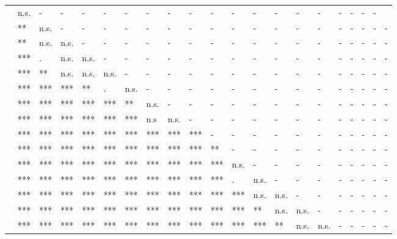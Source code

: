 \documentclass[11pt,fleqn]{article}
\newcommand{\6}{\mbox{$[\hspace*{-.6mm}[$}}
\newcommand{\9}{\mbox{$]\hspace*{-.6mm}]$}}
\begin{document}
\begin{table}[H]
\begin{tabular}{l l l l l l l l l l l l l l l l l l l l l }
\color{brown}{\em pretend}\color{black}	&  n.s. & - & - & - & - & - & - & - & - & - & - & - & - & - & - & - & - & - & - \\
\color{airforceblue}{\em be right}\color{black}	& ** & n.s. & - & - & - & - & - & - & - & - & - & - & - & - & - & - & - & - & - & - \\
\color{brown}{\em think}\color{black}		& ** & n.s. & n.s. & - & - & - & - & - & - & - & - & - & - & - & - & - & - & - & - & - \\
\color{brown}{\em suggest}\color{black}	& ***	& . & n.s. & n.s. & - & - & - & - & - & - & - & - & - & - & - & - & - & - & - & - \\
\color{brown}{\em say}	\color{black}	& ***	& ** & n.s. & n.s. & n.s. & - & - & - & - & - & - & - & - & - & - & - & - & - & - & - \\
\color{black}{\em prove}\color{black}		& ***	& *** &  ***  & ** & . & n.s. & - & - & - & - & - & - & - & - & - & - & - & - & - & - \\
\color{black}{\em confirm}\color{black}	&***	& ***  &  ***  &  ***  &  ***  & ** & n.s. & - & - & - & - & - & - & - & - & - & - & - & - & - \\
\color{black}{\em establish}\color{black}	&***	&  ***  &  ***  &  ***  &  ***  &  ***  & n.s & n.s. & - & - & - & - & - & - & - & - & - & - & - & - \\
\color{airforceblue}{\em demonstrate}\color{black} &*** & *** & *** & *** &  *** &  *** &  ***  &  ***  &  ***  & - & - & - & - & - & - & - & - & - & - & - \\
\color{black}{\em announce}\color{black}		& ***	& *** & *** & *** & *** & *** & *** &  ***  &  ***  & ** & - & - & - & - & - & - & - & - & - & - \\
\color{black}{\em confess}\color{black}	& ***	& *** & *** & *** & *** & *** & *** & *** & *** &  ***  & n.s. & - & - & - & - & - & - & - & - & - \\
\color{black}{\em admit}\color{black}		& ***	& *** & *** & *** & *** & *** & *** & *** & *** &  ***  & . & n.s. &  - & - & - & - & - & - & - & - \\
\color{blue}{\em reveal}\color{black}			& ***	& *** & *** & *** & *** & *** & *** & *** & *** &  ***  &  ***  & n.s. & n.s. & - & - & - & - & - & - & - \\
\color{black}{\em acknowledge}\color{black}	& ***	& *** & *** & *** & *** & *** & *** & *** & *** &  ***  &  ***  & ** & n.s. & n.s. & - & - & - & - & - & - \\
\color{black}{\em hear}\color{black}		& ***	& *** & *** & *** & *** & *** & *** & *** & *** & *** &  ***  &  ***  & ** & n.s. & n.s. & - & - & - & - & - \\

\end{tabular}
\end{table}
\end{document}
